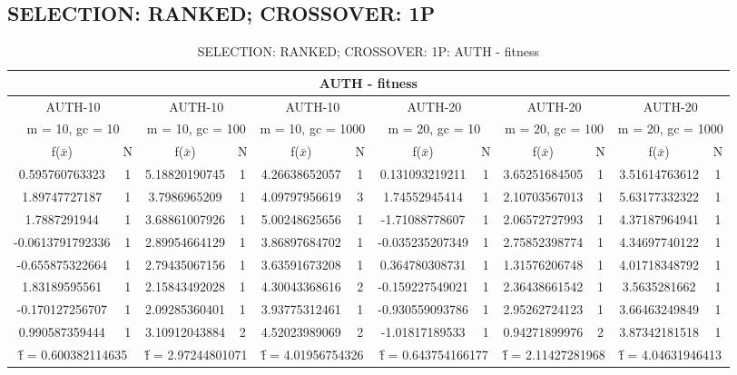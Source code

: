 \subsection{SELECTION: RANKED; CROSSOVER: 1P}
\begin{table}[H]
	\centering
	\caption{SELECTION: RANKED; CROSSOVER: 1P: AUTH - fitness}
	\begin{adjustbox}{width=1\textwidth}
		\begin{tabular}{ |c|c||c|c||c|c||c|c||c|c||c|c| }
			\hline
			\multicolumn{12}{|c|}{AUTH - fitness} \\
			\hline
			\multicolumn{2}{|c||}{AUTH-10} & \multicolumn{2}{c||}{AUTH-10} & \multicolumn{2}{c||}{AUTH-10} & \multicolumn{2}{c||}{AUTH-20} & \multicolumn{2}{c||}{AUTH-20} & \multicolumn{2}{c|}{AUTH-20}\\
			\hline
			\multicolumn{2}{|c||}{m = 10, gc = 10} & \multicolumn{2}{c||}{m = 10, gc = 100} & \multicolumn{2}{c||}{m = 10, gc = 1000} & \multicolumn{2}{c||}{m = 20, gc = 10} & \multicolumn{2}{c||}{m = 20, gc = 100} & \multicolumn{2}{c|}{m = 20, gc = 1000}\\
			\hline
			f($\bar{x}$) & N & f($\bar{x}$) & N & f($\bar{x}$) & N & f($\bar{x}$) & N & f($\bar{x}$) & N & f($\bar{x}$) & N\\
			\hline
			\hline
			0.595760763323 & 1 & 5.18820190745 & 1 & 4.26638652057 & 1 & 0.131093219211 & 1 & 3.65251684505 & 1 & 3.51614763612 & 1\\
			1.89747727187 & 1 & 3.7986965209 & 1 & 4.09797956619 & 3 & 1.74552945414 & 1 & 2.10703567013 & 1 & 5.63177332322 & 1\\
			1.7887291944 & 1 & 3.68861007926 & 1 & 5.00248625656 & 1 & -1.71088778607 & 1 & 2.06572727993 & 1 & 4.37187964941 & 1\\
			-0.0613791792336 & 1 & 2.89954664129 & 1 & 3.86897684702 & 1 & -0.035235207349 & 1 & 2.75852398774 & 1 & 4.34697740122 & 1\\
			-0.655875322664 & 1 & 2.79435067156 & 1 & 3.63591673208 & 1 & 0.364780308731 & 1 & 1.31576206748 & 1 & 4.01718348792 & 1\\
			1.83189595561 & 1 & 2.15843492028 & 1 & 4.30043368616 & 2 & -0.159227549021 & 1 & 2.36438661542 & 1 & 3.5635281662 & 1\\
			-0.170127256707 & 1 & 2.09285360401 & 1 & 3.93775312461 & 1 & -0.930559093786 & 1 & 2.95262724123 & 1 & 3.66463249849 & 1\\
			0.990587359444 & 1 & 3.10912043884 & 2 & 4.52023989069 & 2 & -1.01817189533 & 1 & 0.94271899976 & 2 & 3.87342181518 & 1\\
			\hline
			\multicolumn{2}{|c||}{\^{f} = 0.600382114635} & \multicolumn{2}{c||}{\^{f} = 2.97244801071} & \multicolumn{2}{c||}{\^{f} = 4.01956754326} & \multicolumn{2}{c||}{\^{f} = 0.643754166177} & \multicolumn{2}{c||}{\^{f} = 2.11427281968} & \multicolumn{2}{c|}{\^{f} = 4.04631946413}\\
			\hline
		\end{tabular}
	\end{adjustbox}
\end{table}
